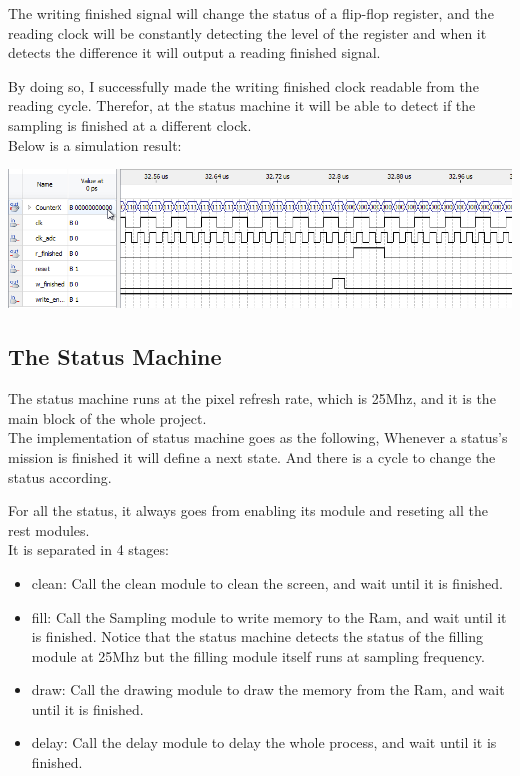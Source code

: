 \documentclass[11pt]{scrartcl}
\begin{document}
The writing finished signal will change the status of a flip-flop register, and the reading clock will be constantly detecting the level of the register and when  it detects the difference it will output a reading finished signal.

By doing so, I successfully made the writing finished clock readable from the reading cycle. Therefor, at the status machine it will be able to detect if the sampling is finished at a different clock.\\


Below is a simulation result:

\begin{minipage}[t]{\linewidth}

{
\includegraphics[scale = 0.5]{dualram.png}
}
\end{minipage}
\medskip

\subsection{The Status Machine}
The status machine runs at the pixel refresh rate, which is 25Mhz, and it is the main block of the whole project. \\


The implementation of status machine goes as the following, Whenever a status's mission is finished it will define a next state. And there is a cycle to change the status according. 

For all the status, it always goes from enabling its module and reseting all the rest modules. \\


It is separated in 4 stages:
\begin{itemize}
    \item clean:
    Call the clean module to clean the screen, and wait until it is finished.
    \item fill:
    Call the Sampling module to write memory to the Ram, and wait until it is finished. Notice that the status machine detects the status of the filling module at 25Mhz but the filling module itself runs at sampling frequency.
    \item draw:
    Call the drawing module to draw the memory from the Ram, and wait until it is finished.
    \item delay:
    Call the delay module to delay the whole process, and wait until it is finished.
\end{itemize}
\end{document}
